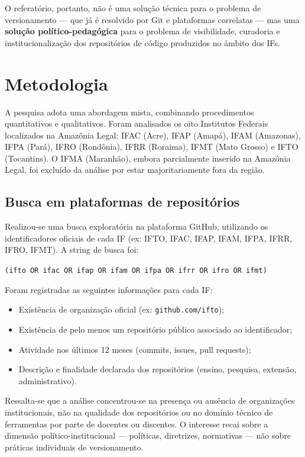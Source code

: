 \documentclass[english, spanish, brazilian]{RBIEarticle}
\begin{document}
	O referatório, portanto, não é uma solução técnica para o problema de versionamento — que já é resolvido por Git e plataformas correlatas — mas uma \textbf{solução político-pedagógica} para o problema de visibilidade, curadoria e institucionalização dos repositórios de código produzidos no âmbito dos IFs.
	
	\section{Metodologia}
	
	A pesquisa adota uma abordagem mista, combinando procedimentos quantitativos e qualitativos. Foram analisados os oito Institutos Federais localizados na Amazônia Legal: IFAC (Acre), IFAP (Amapá), IFAM (Amazonas), IFPA (Pará), IFRO (Rondônia), IFRR (Roraima), IFMT (Mato Grosso) e IFTO (Tocantins). O IFMA (Maranhão), embora parcialmente inserido na Amazônia Legal, foi excluído da análise por estar majoritariamente fora da região.
	
	\subsection{Busca em plataformas de repositórios}
	
	Realizou-se uma busca exploratória na plataforma GitHub, utilizando os identificadores oficiais de cada IF (ex: IFTO, IFAC, IFAP, IFAM, IFPA, IFRR, IFRO, IFMT). A string de busca foi:
	
	\texttt{(ifto OR ifac OR ifap OR ifam OR ifpa OR ifrr OR ifro OR ifmt)}
	
	Foram registradas as seguintes informações para cada IF:
	\begin{itemize}
		\item Existência de organização oficial (ex: \texttt{github.com/ifto});
		\item Existência de pelo menos um repositório público associado ao identificador;
		\item Atividade nos últimos 12 meses (commits, issues, pull requests);
		\item Descrição e finalidade declarada dos repositórios (ensino, pesquisa, extensão, administrativo).
	\end{itemize}
	
	Ressalta-se que a análise concentrou-se na presença ou ausência de organizações institucionais, não na qualidade dos repositórios ou no domínio técnico de ferramentas por parte de docentes ou discentes. O interesse recai sobre a dimensão político-institucional — políticas, diretrizes, normativas — não sobre práticas individuais de versionamento.
	
\end{document}
